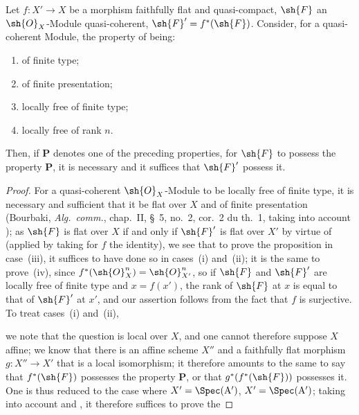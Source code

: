 \begin{proposition}[2.5.2]
\label{IV.2.5.2}
Let $f:X'\to X$ be a morphism faithfully flat and quasi-compact,
$\sh{F}$ an $\sh{O}_X$-Module quasi-coherent, $\sh{F}'=f^*(\sh{F})$. Consider, for a quasi-coherent Module, the
property of being:
\begin{enumerate}[label=(\roman*)]
  \item of finite type;
  \item of finite presentation;
  \item locally free of finite type;
  \item locally free of rank $n$.
\end{enumerate}
Then, if $\mathbf{P}$ denotes one of the preceding properties, for $\sh{F}$ to possess the property $\mathbf{P}$, it is necessary
and it suffices that $\sh{F}'$ possess it.
\end{proposition}


\begin{proof}
For a quasi-coherent $\sh{O}_X$-Module to be locally free of finite type, it is necessary
and sufficient that it be flat over $X$ and of finite presentation (Bourbaki, \emph{Alg.\ comm.}, chap.~II,
\S~5, no.~2, cor.~2 du th.~1, taking into account ); as $\sh{F}$ is flat over $X$ if and
only if $\sh{F}'$ is flat over $X'$ by virtue of  (applied by taking for $f$ the identity),
we see that to prove the proposition in case~(iii), it suffices to have done so in
cases~(i) and~(ii); it is the same to prove~(iv), since $f^*(\sh{O}_X^n)=\sh{O}_{X'}^n$, so if $\sh{F}$ and $\sh{F}'$
are locally free of finite type and $x=f(x')$, the rank of $\sh{F}$ at $x$ is equal to that of $\sh{F}'$
at $x'$, and our assertion follows from the fact that $f$ is surjective. To treat cases~(i) and~(ii),


we note that the question is local over $X$, and one cannot therefore suppose $X$ affine; we know
 that there is an affine scheme $X''$ and a faithfully flat morphism $g:X''\to X'$
that is a local isomorphism; it therefore amounts to the same to say that $f^*(\sh{F})$ possesses
the property $\mathbf{P}$, or that $g^*(f^*(\sh{F}))$ possesses it. One is thus reduced to the case where $X'=\Spec(\mathrm{A}')$,
$X'=\Spec(\mathrm{A}')$; taking into account  and , it therefore suffices to prove the
\end{proof}

